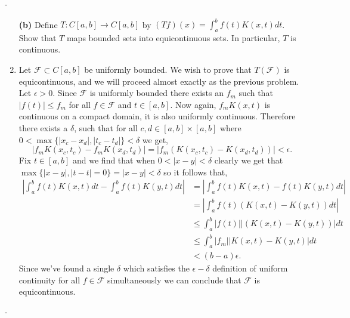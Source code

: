 \documentclass[12pt]{article}
\makeatletter
\theoremstyle{ex215}
\newcounter{probcount}
\newlength\probsep
\newlength\pshrinking
\newenvironment{problems}%
  {\ifhmode\unskip\par\fi\setcounter{probcount}{0}\probsep\parskip
  \sbox\@tempboxa{\textbf{9.}}\pshrinking\wd\@tempboxa\advance\pshrinking\labelsep
  \advance\linewidth -\pshrinking
  \advance\@totalleftmargin\pshrinking
  \advance\leftskip\pshrinking}%
  {\ifhmode\unskip \par\fi\advance\leftskip-\pshrinking}%
\renewenvironment{proof}[1][\proofname]{\par
  \pushQED{\qed}%
  \normalfont \topsep6\p@\@plus6\p@\relax
  \trivlist
  \@topsep \topsep
  \item[\hskip\labelsep
        \itshape
    #1\@addpunct{.}]\ignorespaces
}{%
  \popQED\endtrivlist\@endpefalse
}
\newcommand{\abs}[1]{\left| #1 \right|}
\newcommand{\FF}{\mathcal{F}}
\makeatother
\begin{document}
\begin{problems}
\begin{enumerate}
      \item[\textbf{(b)}] Define $T: C[a, b] \to C[a, b]$ by $(Tf)(x)= \int_{a }^{b } f(t) K(x, t)dt$. Show that $T$ maps bounded sets into equicontinuous sets. In particular, $T$ is continuous. 
      \begin{proof} Let $\FF \subset C[a, b]$ be uniformly bounded. We wish to prove that $T(\FF)$ is equicontinuous, and we will proceed almost exactly as the previous problem. Let $\epsilon > 0$. Since $\FF$ is uniformly bounded there exists an $f_m$ such that $|f(t)| \leq f_m$ for all $f \in \FF$ and $t \in [a,b]$. Now again, $f_mK(x, t)$ is continuous on a compact domain, it is also uniformly continuous. Therefore there exists a $\delta$, such that for all $c,d \in [a, b] \times [a, b]$  where $0 < \max\{|x_c - x_d|, |t_c- t_d|\} < \delta$ we get, 
      \begin{equation*}
        |f_mK(x_c,t_c) - f_mK(x_d,t_d)| = |f_m\left(K(x_c,t_c) - K(x_d,t_d)\right)| < \epsilon.
      \end{equation*}
      Fix $t \in [a, b]$ and we find that when $0 < |x - y|  < \delta$ clearly we get that $\max\{|x - y|, |t- t| = 0\} = \abs{x - y} < \delta$ so it follows that,
        \begin{align*}
          \abs{\int_{a }^{b }f(t) K(x, t)dt - \int_{a }^{b }f(t) K(y, t)dt} &=  \abs{\int_{a }^{b }f(t)K(x, t) - f(t)K(y, t)dt}\\
          &=\abs{\int_{a }^{b }f(t)(K(x, t) -K(y, t))dt}\\
          &\leq\int_{a }^{b }\abs{f(t)}\abs{(K(x, t) -K(y, t))}dt\\
          &\leq\int_{a }^{b }\abs{f_m}\abs{K(x, t) - K(y, t)}dt\\
          &< (b - a) \epsilon.
        \end{align*}
        Since we've found a single $\delta$ which satisfies the $\epsilon-\delta$ definition of uniform continuity for all $f \in \FF$ simultaneously we can conclude that $\FF$ is equicontinuous.


\end{proof}
\end{enumerate}
\end{problems}
\end{document}
